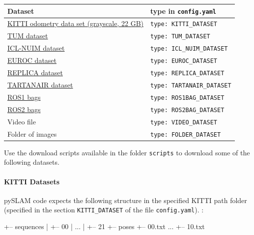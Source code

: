 \documentclass{article}
\newenvironment{Shaded}{\begin{snugshade}}{\end{snugshade}}
\newcommand{\NormalTok}[1]{\textcolor[rgb]{0.74,0.68,0.62}{#1}}
\let\oldparagraph\paragraph
\renewcommand{\paragraph}[1]{\oldparagraph{#1}\mbox{}}
\begin{document}
\begin{longtable}[]{@{}ll@{}}
\toprule
Dataset & type in \texttt{config.yaml}\tabularnewline
\midrule
\endhead
\href{http://www.cvlibs.net/datasets/kitti/eval_odometry.php}{KITTI
odometry data set (grayscale, 22 GB)} &
\texttt{type:\ KITTI\_DATASET}\tabularnewline
\href{https://vision.in.tum.de/data/datasets/rgbd-dataset/download}{TUM
dataset} & \texttt{type:\ TUM\_DATASET}\tabularnewline
\href{https://www.doc.ic.ac.uk/~ahanda/VaFRIC/iclnuim.html}{ICL-NUIM
dataset} & \texttt{type:\ ICL\_NUIM\_DATASET}\tabularnewline
\href{http://projects.asl.ethz.ch/datasets/doku.php?id=kmavvisualinertialdatasets}{EUROC
dataset} & \texttt{type:\ EUROC\_DATASET}\tabularnewline
\href{https://github.com/facebookresearch/Replica-Dataset}{REPLICA
dataset} & \texttt{type:\ REPLICA\_DATASET}\tabularnewline
\href{https://theairlab.org/tartanair-dataset/}{TARTANAIR dataset} &
\texttt{type:\ TARTANAIR\_DATASET}\tabularnewline
\href{https://wiki.ros.org/Bags}{ROS1 bags} &
\texttt{type:\ ROS1BAG\_DATASET}\tabularnewline
\href{https://docs.ros.org/en/foxy/Tutorials/Beginner-CLI-Tools/Recording-And-Playing-Back-Data/Recording-And-Playing-Back-Data.html}{ROS2
bags} & \texttt{type:\ ROS2BAG\_DATASET}\tabularnewline
Video file & \texttt{type:\ VIDEO\_DATASET}\tabularnewline
Folder of images & \texttt{type:\ FOLDER\_DATASET}\tabularnewline
\bottomrule
\end{longtable}

Use the download scripts available in the folder \texttt{scripts} to
download some of the following datasets.

\hypertarget{kitti-datasets}{%
\paragraph{KITTI Datasets}\label{kitti-datasets}}

pySLAM code expects the following structure in the specified KITTI path
folder (specified in the section \texttt{KITTI\_DATASET} of the file
\texttt{config.yaml}). :

\begin{scriptsize}
\begin{Shaded}
\begin{Highlighting}[]
\NormalTok{+-- sequences}
\NormalTok{|   +-- 00}
\NormalTok{|   ...}
\NormalTok{|   +-- 21}
\NormalTok{+-- poses}
\NormalTok{    +-- 00.txt}
\NormalTok{    ...}
\NormalTok{    +-- 10.txt}
\end{Highlighting}
\end{Shaded}
\end{scriptsize}
\end{document}
